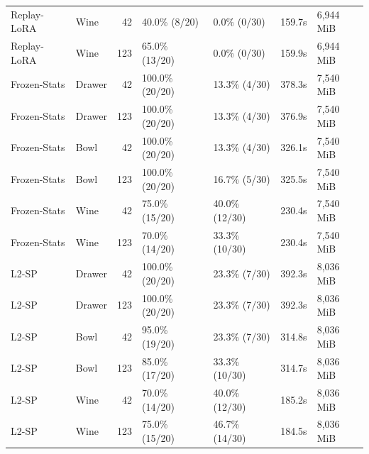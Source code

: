 \documentclass[10pt]{extarticle}
\newcommand{\score}[3]{#1\% (#2/#3)}
\begin{document}
{\begin{longtable}{@{}llrllll@{}}
Replay-LoRA & Wine & 42 & \score{40.0}{8}{20} & \score{0.0}{0}{30} & 159.7s & 6,944 MiB\\
Replay-LoRA & Wine & 123 & \score{65.0}{13}{20} & \score{0.0}{0}{30} & 159.9s & 6,944 MiB\\
\midrule
Frozen-Stats & Drawer & 42 & \score{100.0}{20}{20} & \score{13.3}{4}{30} & 378.3s & 7,540 MiB\\
Frozen-Stats & Drawer & 123 & \score{100.0}{20}{20} & \score{13.3}{4}{30} & 376.9s & 7,540 MiB\\
Frozen-Stats & Bowl & 42 & \score{100.0}{20}{20} & \score{13.3}{4}{30} & 326.1s & 7,540 MiB\\
Frozen-Stats & Bowl & 123 & \score{100.0}{20}{20} & \score{16.7}{5}{30} & 325.5s & 7,540 MiB\\
Frozen-Stats & Wine & 42 & \score{75.0}{15}{20} & \score{40.0}{12}{30} & 230.4s & 7,540 MiB\\
Frozen-Stats & Wine & 123 & \score{70.0}{14}{20} & \score{33.3}{10}{30} & 230.4s & 7,540 MiB\\
\midrule
L2-SP & Drawer & 42 & \score{100.0}{20}{20} & \score{23.3}{7}{30} & 392.3s & 8,036 MiB\\
L2-SP & Drawer & 123 & \score{100.0}{20}{20} & \score{23.3}{7}{30} & 392.3s & 8,036 MiB\\
L2-SP & Bowl & 42 & \score{95.0}{19}{20} & \score{23.3}{7}{30} & 314.8s & 8,036 MiB\\
L2-SP & Bowl & 123 & \score{85.0}{17}{20} & \score{33.3}{10}{30} & 314.7s & 8,036 MiB\\
L2-SP & Wine & 42 & \score{70.0}{14}{20} & \score{40.0}{12}{30} & 185.2s & 8,036 MiB\\
L2-SP & Wine & 123 & \score{75.0}{15}{20} & \score{46.7}{14}{30} & 184.5s & 8,036 MiB\\
\bottomrule
\end{longtable}
}
\end{document}
